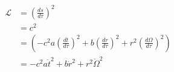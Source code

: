 \documentclass{article}      %
\newcommand{\LL}[0]{\mathcal{L}}
\newcommand{\PD}[2]{\frac{\partial {#2}}{\partial {#1}}}
\newcommand{\dotOmega}[0]{\dot{\Omega}}
\newcommand{\CC}[0]{c^2}
\newcommand{\adot}[0]{\dot{a}}
\newcommand{\tdot}[0]{\dot{t}}
\newcommand{\tddot}[0]{\ddot{t}}
\newcommand{\rdot}[0]{\dot{r}}
\newcommand{\rddot}[0]{\ddot{r}}
\begin{document}
\begin{align*}%
\LL
&= \left(\frac{ds}{d\tau}\right)^2 \\
&= c^2 \\
&= \left( -\CC a \left(\frac{dt}{d\tau}\right)^2 + {b} \left(\frac{dr}{d\tau}\right)^2 + r^2\left(\frac{d\Omega}{d\tau}\right)^2 \right) \\
&= -\CC a \tdot^2 + {b} \rdot^2 + r^2\dotOmega^2 \\
\end{align*}

%
%
%
%
%
%
%
%
%
%
%
%
%
%
%
\end{document}
